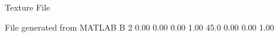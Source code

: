 Texture File
 
File generated from MATLAB
B 2
   0.00   0.00   0.00  1.00
   45.0   0.00   0.00  1.00